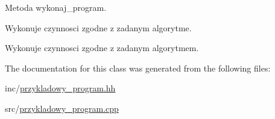 Metoda wykonaj\+\_\+program. 

Wykonuje czynnosci zgodne z zadanym algorytme.

Wykonuje czynnosci zgodne z zadanym algorytmem. 

The documentation for this class was generated from the following files\+:\begin{DoxyCompactItemize}
\item 
inc/\hyperlink{przykladowy__program_8hh}{przykladowy\+\_\+program.\+hh}\item 
src/\hyperlink{przykladowy__program_8cpp}{przykladowy\+\_\+program.\+cpp}\end{DoxyCompactItemize}
